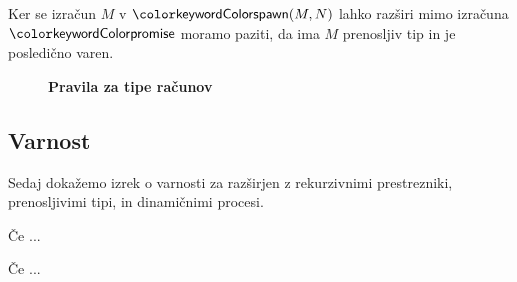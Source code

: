 Ker se izračun $M$ v $\tmspawn{M}{N}$ lahko razširi mimo izračuna $\tmkw{promise}$ moramo paziti, da ima $M$ prenosljiv tip in je posledično varen.   

\begin{figure}[h]
	\centering
	\small
	\textbf{Pravila za tipe računov}
	\begin{mathpar}
	\end{mathpar}
\end{figure}


%
%
%
%	
%
%
%



\subsection{Varnost}

Sedaj dokažemo izrek o varnosti za \lae{} razširjen z rekurzivnimi prestrezniki, prenosljivimi tipi, in dinamičnimi procesi.

\begin{izrek}
	Če ...
\end{izrek}



\begin{izrek}
	Če ...
\end{izrek}



